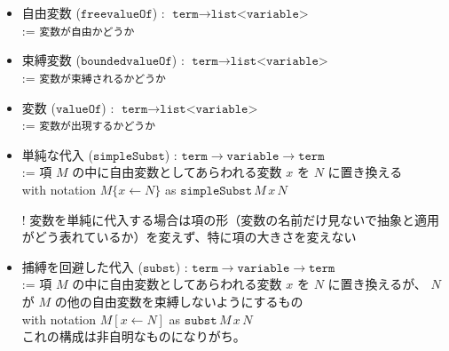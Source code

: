 \documentclass[dvipdfmx]{jsarticle}
\begin{document}
\begin{itemize}
  \item 自由変数 (\(\texttt{freevalueOf}\)) : \(\texttt{term} \to \texttt{list<variable>}\) \\
  := \texttt{変数が自由かどうか}
  \item 束縛変数 (\(\texttt{boundedvalueOf}\)) : \(\texttt{term} \to \texttt{list<variable>}\) \\
  := \texttt{変数が束縛されるかどうか}
  \item 変数 (\(\texttt{valueOf}\)) : \(\texttt{term} \to \texttt{list<variable>}\) \\
  := \texttt{変数が出現するかどうか}
  \item 単純な代入 (\(\texttt{simpleSubst}\)) : \(\texttt{term} \to \texttt{variable} \to \texttt{term}\) \\
    := 項 \(M\) の中に自由変数としてあらわれる変数 \(x\) を \(N\) に置き換える \\
    with notation \(M\{x \leftarrow N\}\) as \(\texttt{simpleSubst} \, M \, x \, N\)
  \item[!] 変数を単純に代入する場合は項の形（変数の名前だけ見ないで抽象と適用がどう表れているか）を変えず、特に項の大きさを変えない
  \item 捕縛を回避した代入 (\(\texttt{subst}\)) : \(\texttt{term} \to \texttt{variable} \to \texttt{term}\) \\
    := 項 \(M\) の中に自由変数としてあらわれる変数 \(x\) を \(N\) に置き換えるが、 \(N\) が \(M\) の他の自由変数を束縛しないようにするもの \\
    with notation \(M[x \leftarrow N]\) as \(\texttt{subst} \, M \, x \, N\) \\
    これの構成は非自明なものになりがち。
\end{itemize}
\end{document}
